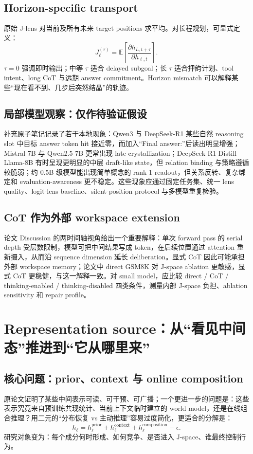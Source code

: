 \documentclass[10.5pt,a4paper]{ctexart}
\begin{document}
\subsection{Horizon-specific transport}
原始 J-lens 对当前及所有未来 target positions 求平均。对长程规划，可显式定义：
\[
J_\ell^{(\tau)}
=
\mathbb E\left[
\frac{\partial h_{L,t+\tau}}{\partial h_{\ell,t}}
\right].
\]
$\tau=0$ 强调即时输出；中等 $\tau$ 适合 delayed subgoal；长 $\tau$ 适合押韵计划、tool intent、long CoT 与远期 answer commitment。Horizon mismatch 可以解释某些“现在看不到、几步后突然结晶”的轨迹。

\subsection{局部模型观察：仅作待验证假设}
\begin{warningclaim}[title={\bfseries 局部观察，尚未形成跨模型结论}]
补充原子笔记记录了若干本地现象：Qwen3 与 DeepSeek-R1 某些自然 reasoning slot 中目标 answer token hit 接近零，而加入“Final answer:”后读出明显增强；Mistral-7B 与 Qwen2.5-7B 更常出现 late crystallization；DeepSeek-R1-Distill-Llama-8B 有时呈现更明显的中层 draft-like state，但 relation binding 与策略遵循较脆弱；约 0.5B 级模型能出现简单概念的 rank-1 readout，但关系反转、复杂绑定和 evaluation-awareness 更不稳定。这些现象应通过固定任务集、统一 lens quality、logit-lens baseline、silent-position protocol 与多模型重复检验。
\end{warningclaim}

\subsection{CoT 作为外部 workspace extension}
论文 Discussion 的两时间轴视角给出一个重要解释：单次 forward pass 的 serial depth 受层数限制，模型可把中间结果写成 token，在后续位置通过 attention 重新摄入，从而沿 sequence dimension 延长 deliberation。显式 CoT 因此可能承担外部 workspace memory；论文中 direct GSM8K 对 J-space ablation 更敏感，显式 CoT 更稳健，与这一解释一致。对 small model，应比较 direct / CoT / thinking-enabled / thinking-disabled 四类条件，测量内部 J-space 负担、ablation sensitivity 和 repair profile。

\section{Representation source：从“看见中间态”推进到“它从哪里来”}

\subsection{核心问题：prior、context 与 online composition}
原论文证明了某些中间表示可读、可干预、可广播；一个更进一步的问题是：这些表示究竟来自预训练共现统计、当前上下文临时建立的 world model，还是在线组合推理？用二元的“分布恢复 vs 主动推理”容易过度简化，更适合的分解是：
\[
h_\ell
=
h_\ell^{\mathrm{prior}}
+h_\ell^{\mathrm{context}}
+h_\ell^{\mathrm{composition}}
+\epsilon.
\]
研究对象变为：每个成分何时形成、如何竞争、是否进入 J-space、谁最终控制行为。
\end{document}
